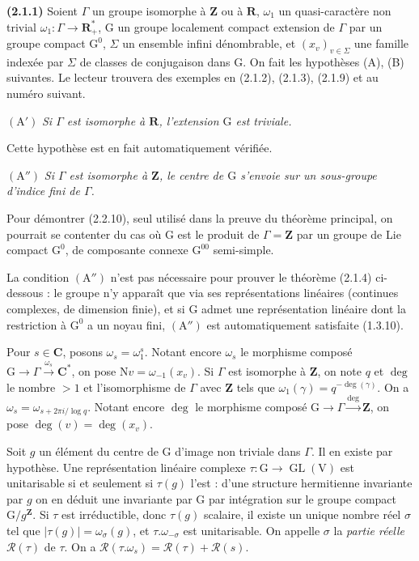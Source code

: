 \documentclass[11pt,leqno]{article}
\begin{document}
\textbf{(2.1.1)} Soient \(\Gamma\) un groupe isomorphe à \(\mathbf{Z}\) ou à \(\mathbf{R}\), \(\omega_1\) un quasi-caractère non trivial \(\omega_1:\Gamma\to\mathbf{R}_+^*\), \(\mathrm{G}\) un groupe localement compact extension de \(\Gamma\) par un groupe compact \(\mathrm{G}^0\), \(\Sigma\) un ensemble infini dénombrable, et \((x_v)_{v\in\Sigma}\) une famille indexée par \(\Sigma\) de classes de conjugaison dans \(\mathrm{G}\). On fait les hypothèses (A), (B) suivantes. Le lecteur trouvera des exemples en (2.1.2), (2.1.3), (2.1.9) et au numéro suivant.

\((\mathrm{A}')\) \textit{Si \(\Gamma\) est isomorphe à \(\mathbf{R}\), l’extension \(\mathrm{G}\) est triviale.}

Cette hypothèse est en fait automatiquement vérifiée.

\((\mathrm{A}'')\) \textit{Si \(\Gamma\) est isomorphe à \(\mathbf{Z}\), le centre de \(\mathrm{G}\) s’envoie sur un sous-groupe d’indice fini de \(\Gamma\).}

Pour démontrer (2.2.10), seul utilisé dans la preuve du théorème principal, on pourrait se contenter du cas où \(\mathrm{G}\) est le produit de \(\Gamma=\mathbf{Z}\) par un groupe de Lie compact \(\mathrm{G}^0\), de composante connexe \(\mathrm{G}^{00}\) semi-simple.

La condition \((\mathrm{A}'')\) n’est pas nécessaire pour prouver le théorème (2.1.4) ci-dessous : le groupe n’y apparaît que via ses représentations linéaires (continues complexes, de dimension finie), et si \(\mathrm{G}\) admet une représentation linéaire dont la restriction à \(\mathrm{G}^0\) a un noyau fini, \((\mathrm{A}'')\) est automatiquement satisfaite (1.3.10).

Pour \(s\in\mathbf{C}\), posons \(\omega_s=\omega_1^s\). Notant encore \(\omega_s\) le morphisme composé \(\mathrm{G}\to\Gamma\xrightarrow{\omega_s}\mathbf{C}^*\), on pose \(\mathrm{N}v=\omega_{-1}(x_v)\). Si \(\Gamma\) est isomorphe à \(\mathbf{Z}\), on note \(q\) et \(\deg\) le nombre \(>1\) et l’isomorphisme de \(\Gamma\) avec \(\mathbf{Z}\) tels que \(\omega_1(\gamma)=q^{-\deg(\gamma)}\). On a \(\omega_s=\omega_{s+2\pi i/\log q}\). Notant encore \(\deg\) le morphisme composé \(\mathrm{G}\to\Gamma\xrightarrow{\deg}\mathbf{Z}\), on pose \(\deg(v)=\deg(x_v)\).

Soit \(g\) un élément du centre de \(\mathrm{G}\) d’image non triviale dans \(\Gamma\). Il en existe par hypothèse. Une représentation linéaire complexe \(\tau:\mathrm{G}\to\operatorname{GL}(\mathrm{V})\) est unitarisable si et seulement si \(\tau(g)\) l’est : d’une structure hermitienne invariante par \(g\) on en déduit une invariante par \(\mathrm{G}\) par intégration sur le groupe compact \(\mathrm{G}/g^{\mathbf{Z}}\). Si \(\tau\) est irréductible, donc \(\tau(g)\) scalaire, il existe un unique nombre réel \(\sigma\) tel que \(|\tau(g)|=\omega_\sigma(g)\), et \(\tau.\omega_{-\sigma}\) est unitarisable. On appelle \(\sigma\) la \textit{partie réelle} \(\mathscr{R}(\tau)\) de \(\tau\). On a \(\mathscr{R}(\tau.\omega_s)=\mathscr{R}(\tau)+\mathscr{R}(s)\).
\end{document}
